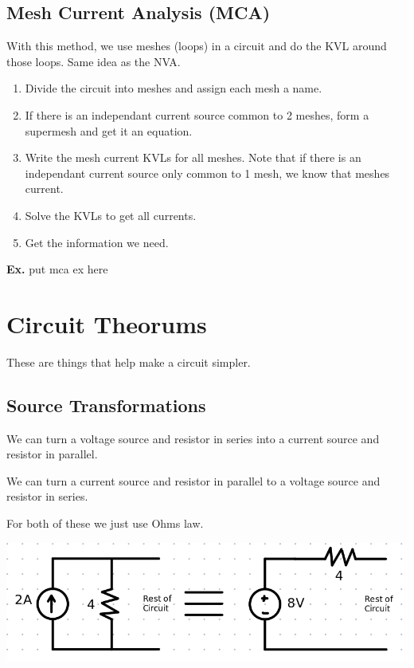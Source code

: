\documentclass[12pt,letterpaper]{article} \usepackage{amsmath} \usepackage{graphicx} \usepackage[margin=1in]{geometry} \usepackage{longtable}  \usepackage{amssymb}
\begin{document}
	\subsection{Mesh Current Analysis (MCA)}
	With this method, we use meshes (loops) in a circuit and do the KVL around those loops. Same idea as the NVA. 
	
	\begin{enumerate}[noitemsep]
		\item Divide the circuit into meshes and assign each mesh a name.
		\item If there is an independant current source common to 2 meshes, form a supermesh and get it an equation. 
		\item Write the mesh current KVLs for all meshes. Note that if there is an independant current source only common to 1 mesh, we know that meshes current.
		\item Solve the KVLs to get all currents.
		\item Get the information we need. 
	\end{enumerate}

	\begin{mdframed}
		\textbf{Ex. } put mca ex here
	\end{mdframed}
	
	\section{Circuit Theorums}
	These are things that help make a circuit simpler. 
	
	\subsection{Source Transformations}
	We can turn a voltage source and resistor in series into a current source and resistor in parallel.
	
	We can turn a current source and resistor in parallel to a voltage source and resistor in series.
	
	For both of these we just use Ohms law. 
	\begin{center}
		\includegraphics[width=0.7\linewidth]{transSource}
	\end{center}
	
\end{document}
